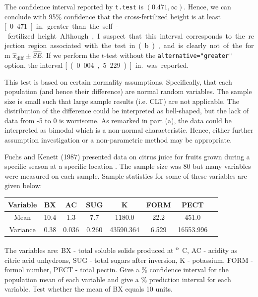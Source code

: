 \documentclass{homework}
\begin{document}

\begin{solution}
The confidence interval reported by \texttt{t.test}  is
$(0.471,\infty)$. Hence, we can conclude with 95\% confidence that the cross-fertilized height is at least \unit[0.471]{in.} greater than the self-fertilized height.  Although, I suspect that this interval corresponds to the rejection region associated with the test in (b), and is clearly not of the form $\widehat x_{\mathrm{diff}} \pm \widehat{SE}$. If we perform the $t$-test without the \texttt{alternative="greater"} option, the interval \unit[(0.004, 5.229)]{in.} was reported.
\end{solution}

\newpage


\begin{solution}
  This test is based on certain normality assumptions. Specifically, that each
  population (and hence their difference) are normal random variables.  The
  sample size is small such that large sample results (i.e. CLT) are not
  applicable.  The distribution of the difference could be interpreted as
  bell-shaped, but the lack of data from -5 to 0 is worrisome.  As remarked in
  part (a), the data could be interpreted as bimodal which is a non-normal
  characteristic.  Hence, either further assumption investigation or a non-parametric method may be appropriate.
\end{solution}

\begin{longproblem}
  Fuchs and Kenett (1987) presented data on citrus juice for fruits grown during a specific season at a specific location .  The sample size was 80 but many variables were measured on each sample.  Sample statistics for some of these variables are given below:
  \begin{center}
  \begin{tabular}{c c c c c c c c}
  Variable & BX & AC & SUG & K & FORM & PECT \\ \hline
  Mean & 10.4 & 1.3 & 7.7 & 1180.0 & 22.2 & 451.0 \\
  Variance & 0.38 & 0.036 & 0.260 & 43590.364 & 6.529 & 16553.996 \\\hline
  \end{tabular}
  \end{center}
  The variables are: BX - total soluble solids produced at \unit[20]{\textsuperscript oC}, AC - acidity as citric acid unhydrons, SUG - total sugars after inversion, K - potassium, FORM - formol number, PECT - total pectin.  Give a \unit[99]{\%} confidence interval for the population mean of each variable and give a \unit[99]{\%} prediction interval for each variable.  Test whether the mean of BX equals 10 units.  
\end{longproblem}
\end{document}
